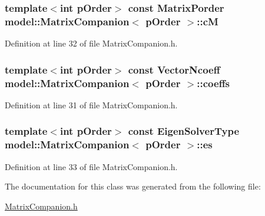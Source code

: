 \subsubsection[{c\+M}]{\setlength{\rightskip}{0pt plus 5cm}template$<$int p\+Order$>$ const Matrix\+Porder {\bf model\+::\+Matrix\+Companion}$<$ {\bf p\+Order} $>$\+::c\+M}\label{classmodel_1_1_matrix_companion_a8b6814bc0e757bb44d315c86a39afc73}


Definition at line 32 of file Matrix\+Companion.\+h.

\hypertarget{classmodel_1_1_matrix_companion_a5f15838a7b111f1ba19ee2d16106236d}{}
\subsubsection[{coeffs}]{\setlength{\rightskip}{0pt plus 5cm}template$<$int p\+Order$>$ const Vector\+Ncoeff {\bf model\+::\+Matrix\+Companion}$<$ {\bf p\+Order} $>$\+::coeffs}\label{classmodel_1_1_matrix_companion_a5f15838a7b111f1ba19ee2d16106236d}


Definition at line 31 of file Matrix\+Companion.\+h.

\hypertarget{classmodel_1_1_matrix_companion_a43bdf2e1a6a86e491dbcf7b2c50e45c9}{}
\subsubsection[{es}]{\setlength{\rightskip}{0pt plus 5cm}template$<$int p\+Order$>$ const Eigen\+Solver\+Type {\bf model\+::\+Matrix\+Companion}$<$ {\bf p\+Order} $>$\+::es}\label{classmodel_1_1_matrix_companion_a43bdf2e1a6a86e491dbcf7b2c50e45c9}


Definition at line 33 of file Matrix\+Companion.\+h.



The documentation for this class was generated from the following file\+:\begin{DoxyCompactItemize}
\item 
\hyperlink{_matrix_companion_8h}{Matrix\+Companion.\+h}\end{DoxyCompactItemize}
